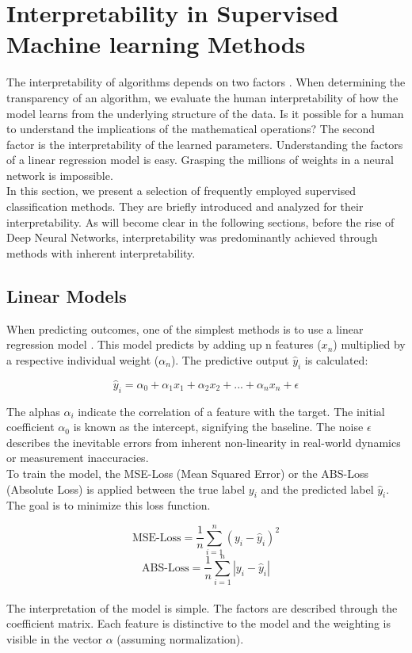 \chapter{Interpretability in Supervised Machine learning Methods}
\label{sec:MLandI}


The interpretability of algorithms depends on two factors \cite{molnar2022}. When determining the transparency of an algorithm, we evaluate the human interpretability of how the model learns from the underlying structure of the data. Is it possible for a human to understand the implications of the mathematical operations? The second factor is the interpretability of the learned parameters. Understanding the factors of a linear regression model is easy. Grasping the millions of weights in a neural network is impossible.
\\
In this section, we present a selection of frequently employed supervised classification methods. They are briefly introduced and analyzed for their interpretability. As will become clear in the following sections, before the rise of Deep Neural Networks, interpretability was predominantly achieved through methods with inherent interpretability.

\section{Linear Models}

When predicting outcomes, one of the simplest methods is to use a linear regression model \cite{puntanen2013methods}. This model predicts by adding up n features ($x_n$) multiplied by a respective individual weight ($\alpha_n$). The predictive output $\hat{y}_i$ is calculated:

$$ \hat{y}_i= \alpha_0 + \alpha_1 x_1 + \alpha_2 x_2 +... +\alpha_n x_{n} + \epsilon$$

The alphas $\alpha_i$ indicate the correlation of a feature with the target. The initial coefficient $\alpha_0$ is known as the intercept, signifying the baseline. The noise $\epsilon$ describes the inevitable errors from inherent non-linearity in real-world dynamics or measurement inaccuracies.
\\
To train the model, the MSE-Loss (Mean Squared Error) or the ABS-Loss (Absolute Loss) is applied between the true label $y_i$ and the predicted label $\hat{y}_i$. The goal is to minimize this loss function. 

$$ \text{MSE-Loss} = \frac{1}{n} \sum_{i=1}^{n} (y_i - \hat{y}_i)^2$$
$$ \text{ABS-Loss} = \frac{1}{n} \sum_{i=1}^{n} |y_i - \hat{y}_i|$$
\\
The interpretation of the model is simple. The factors are described through the coefficient matrix. Each feature is distinctive to the model and the weighting is visible in the vector $\alpha$ (assuming normalization).

